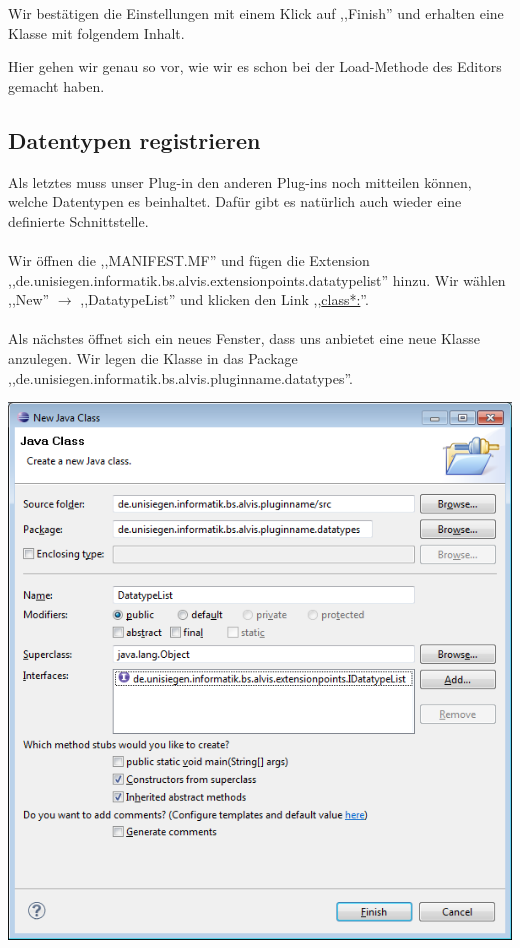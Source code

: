 \documentclass[10pt,a4paper]{article}
\begin{document}
Wir bestätigen die Einstellungen mit einem Klick auf ,,Finish'' und erhalten eine Klasse mit folgendem Inhalt.



Hier gehen wir genau so vor, wie wir es schon bei der Load-Methode des Editors gemacht haben.

\subsection{Datentypen registrieren}

Als letztes muss unser Plug-in den anderen Plug-ins noch mitteilen können, welche Datentypen es beinhaltet. Dafür gibt es natürlich auch wieder eine definierte Schnittstelle.
\\ \\
Wir öffnen die ,,MANIFEST.MF'' und fügen die Extension \\ ,,de.unisiegen.informatik.bs.alvis.extensionpoints.datatypelist'' hinzu. Wir wählen ,,New'' \(\rightarrow\) ,,DatatypeList'' und klicken den Link ,,\underline{class*:}''.
\\ \\
Als nächstes öffnet sich ein neues Fenster, dass uns anbietet eine neue Klasse anzulegen. Wir legen die Klasse in das Package \\,,de.unisiegen.informatik.bs.alvis.pluginname.datatypes''.

\begin{center}
\includegraphics[scale=0.48]{images/new_plugin_datatypeslist_00}
\end{center}
\end{document}
